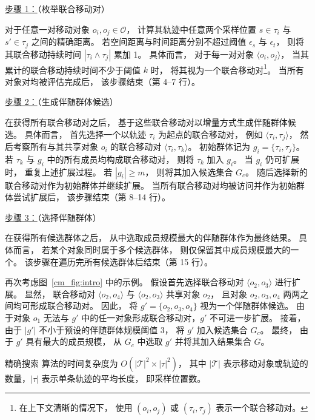     \underline{步骤 1：}（枚举联合移动对）

    对于任意一对移动对象 $o_i, o_j \in \mathcal{O}$， 计算其轨迹中任意两个采样位置
    $s \in \tau_i$ 与 $s' \in \tau_j$ 之间的精确距离。 若空间距离与时间距离分别不超过阈值 $\epsilon_s$ 与 $\epsilon_t$， 则将其联合移动持续时间 $|\tau_i \land \tau_j|$ 累加 1。 具体而言， 对于每一对对象 $\langle o_i,o_j\rangle$， 当其累计的联合移动持续时间不少于阈值 $k$ 时， 将其视为一个联合移动对\footnote{在上下文清晰的情况下， 使用 $(o_i,o_j)$ 或 $(\tau_i,\tau_j)$ 表示一个联合移动对。}。 当所有对象对均被评估完成后， 该步骤结束（第 4--7 行）。

    \underline{步骤 2：}（生成伴随群体候选）

    在获得所有联合移动对之后， 基于这些联合移动对以增量方式生成伴随群体候选。 具体而言， 首先选择一个以轨迹 $\tau_i$ 为起点的联合移动对， 例如 $\langle \tau_i,\tau_j\rangle$， 然后考察所有与其共享对象 $o_i$ 的联合移动对 $\langle \tau_i,\tau_k\rangle$。 初始群体记为 $g_i=\{\tau_i,\tau_j\}$。 若 $\tau_k$ 与 $g_i$ 中的所有成员均构成联合移动对， 则将 $\tau_k$ 加入 $g_i$。 当 $g_i$ 仍可扩展时， 重复上述扩展过程。 若 $|g_i| \ge m$， 则将其加入候选集合 $G_c$。 随后选择新的联合移动对作为初始群体并继续扩展。 当所有联合移动对均被访问并作为初始群体尝试扩展后， 该步骤结束（第 8--14 行）。

    \underline{步骤 3：}（选择伴随群体）

    在获得所有候选群体之后， 从中选取成员规模最大的伴随群体作为最终结果。 具体而言， 若某个对象同时属于多个候选群体， 则仅保留其中成员规模最大的一个。 该步骤在遍历完所有候选群体后结束（第 15 行）。

    \begin{example}[精确搜索算法示例]
    再次考虑图~\ref{cm_fig:intro} 中的示例。 假设首先选择联合移动对 $\langle o_2,o_3\rangle$ 进行扩展。 显然， 联合移动对 $\langle o_2,o_4\rangle$ 与 $\langle o_2,o_3\rangle$ 共享对象 $o_2$， 且对象 $o_2,o_3,o_4$ 两两之间均可形成联合移动对。 因此， 将 $g'=\{o_2,o_3,o_4\}$ 视为一个伴随群体候选。 由于对象 $o_1$ 无法与 $g'$ 中的任一对象形成联合移动对，$g'$ 不可进一步扩展。 接着， 由于 $|g'|$ 不小于预设的伴随群体规模阈值 3， 将 $g'$ 加入候选集合 $G_c$。 最终， 由于 $g'$ 具有最大的成员规模， 从 $G_c$ 中选取 $g'$ 并将其加入结果集合 $G$。
    \end{example}



    \begin{theorem}
    精确搜索 算法的时间复杂度为 $O(|\mathcal{T}|^2 \times |\tau|^2)$， 其中 $|\mathcal{T}|$ 表示移动对象或轨迹的数量，$|\tau|$ 表示单条轨迹的平均长度， 即采样位置数。
    \end{theorem}

